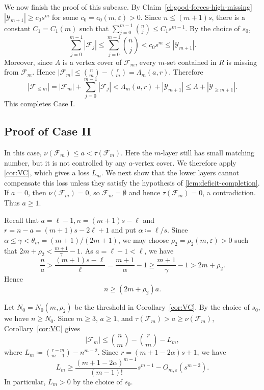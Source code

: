 \documentclass[10pt,a4paper]{article}
\numberwithin{equation}{section}
\theoremstyle{definition}
\newcommand{\F}{\mathcal F}
\newcommand{\Y}{\mathcal Y}
\begin{document}
We now finish the proof of this subcase.
By Claim~\ref{cl:good-forces-high-missing} $|\Y_{m+1}|\ge c_0s^m$ for some \(c_0=c_0(m,\varepsilon)>0\).
Since \(n\le(m+1)s\), there is a constant \(C_1=C_1(m)\) such that
\(\sum_{j=0}^{m-1}\binom nj\le C_1s^{m-1}.\)
By the choice of \(s_0\),
\[
    \sum_{j=0}^{m-1}|\F_j|
    \le
    \sum_{j=0}^{m-1}\binom nj
    <
    c_0s^m
    \le
    |\Y_{m+1}|.
\]
Moreover, since \(A\) is a vertex cover of \(\F_m\), every \(m\)-set contained
in \(R\) is missing from \(\F_m\).  Hence
\(|\F_m|\le \binom nm-\binom rm=\Lambda_m(a,r).\)
Therefore
\[
    |\F_{\le m}|
    =
    |\F_m|+\sum_{j=0}^{m-1}|\F_j|
    <
    \Lambda_m(a,r)+|\Y_{m+1}|
    \le
    \Lambda+|\Y_{\ge m+1}|.
\]
This completes Case I.


\subsection{Proof of Case II}

In this case, \(\nu(\F_m)\le a<\tau(\F_m)\).
Here the $m$-layer still has small matching number, but it is not controlled by any $a$-vertex cover.
We therefore apply \cref{cor:VC}, which gives a loss $L_m$.
We next show that the lower layers cannot compensate this loss unless they satisfy the hypothesis of \cref{lem:deficit-completion}.
If \(a=0\), then \(\nu(\F_m)=0\), so \(\F_m=\emptyset\) and hence \(\tau(\F_m)=0\), a contradiction.
Thus \(a\ge1\).

Recall that $a=\ell-1, n=(m+1)s-\ell$ and $r=n-a=(m+1)s-2\ell+1$ and put \(\alpha\coloneqq\ell/s\).
Since \(\alpha\le\gamma<\theta_m=(m+1)/(2m+1)\), we may choose
\(\rho_2=\rho_2(m,\varepsilon)>0\) such that
\(2m+\rho_2<\frac{m+1}{\gamma}-1.\)
As \(a=\ell-1<\ell\), we have
\[
    \frac na
    >
    \frac{(m+1)s-\ell}{\ell}
    =
    \frac{m+1}{\alpha}-1
    \ge
    \frac{m+1}{\gamma}-1
    >
    2m+\rho_2.
\]
Hence
\begin{equation}\label{eq:caseII-ratio-for-VC}
    n\ge(2m+\rho_2)a.
\end{equation}

Let \(N_0=N_0(m,\rho_2)\) be the threshold in Corollary~\ref{cor:VC}.  By the
choice of \(s_0\), we have \(n\ge N_0\).  Since \(m\ge3\), \(a\ge1\), and
\(\tau(\F_m)>a\ge\nu(\F_m)\), Corollary~\ref{cor:VC} gives
\begin{equation}\label{eq:caseII-Fm-clean}
    |\F_m|
    \le
    \binom nm-\binom rm-L_m,
\end{equation}
where
\(L_m\coloneqq \binom{r-m}{m-1}-n^{m-2}.\)
Since \(r=(m+1-2\alpha)s+1\), we have
\begin{equation}\label{eq:caseII-Lm-main-clean}
    L_m
    \ge
    \frac{(m+1-2\alpha)^{m-1}}{(m-1)!}s^{m-1}
    -O_{m,\varepsilon}(s^{m-2}).
\end{equation}
In particular, \(L_m>0\) by the choice of \(s_0\).
\end{document}
